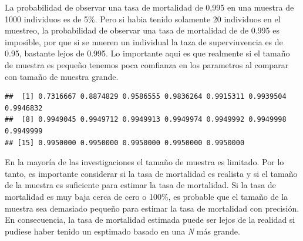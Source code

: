 \documentclass[
]{book}
\newenvironment{Shaded}{\begin{snugshade}}{\end{snugshade}}
\newcommand{\AttributeTok}[1]{\textcolor[rgb]{0.13,0.29,0.53}{#1}}
\newcommand{\CommentTok}[1]{\textcolor[rgb]{0.56,0.35,0.01}{\textit{#1}}}
\newcommand{\FloatTok}[1]{\textcolor[rgb]{0.00,0.00,0.81}{#1}}
\newcommand{\FunctionTok}[1]{\textcolor[rgb]{0.13,0.29,0.53}{\textbf{#1}}}
\newcommand{\NormalTok}[1]{#1}
\newcommand{\OtherTok}[1]{\textcolor[rgb]{0.56,0.35,0.01}{#1}}
\newcommand{\SpecialCharTok}[1]{\textcolor[rgb]{0.81,0.36,0.00}{\textbf{#1}}}
\theoremstyle{definition}
\theoremstyle{definition}
\theoremstyle{definition}
\theoremstyle{definition}
\theoremstyle{remark}
\begin{document}
La probabilidad de observar una tasa de mortalidad de 0,995 en una muestra de 1000 individuos es de 5\%. Pero si habia tenido solamente 20 individuos en el muestreo, la probabilidad de observar una tasa de mortalidad de de 0.995 es imposible, por que si se mueren un individual la taza de superviuvencia es de 0.95, bastante lejos de 0.995. Lo importante aqui es que realmente si el tamaño de muestra es pequeño tenemos poca comfianza en los parametros al comparar con tamaño de muestra grande.

\begin{Shaded}
\end{Shaded}

\begin{verbatim}
##  [1] 0.7316667 0.8874829 0.9586555 0.9836264 0.9915311 0.9939504 0.9946832
##  [8] 0.9949045 0.9949712 0.9949913 0.9949974 0.9949992 0.9949998 0.9949999
## [15] 0.9950000 0.9950000 0.9950000 0.9950000 0.9950000
\end{verbatim}

En la mayoría de las investigaciones el tamaño de muestra es limitado. Por lo tanto, es importante considerar si la tasa de mortalidad es realista y si el tamaño de la muestra es suficiente para estimar la tasa de mortalidad. Si la tasa de mortalidad es muy baja cerca de cero o 100\%, es probable que el tamaño de la muestra sea demasiado pequeño para estimar la tasa de mortalidad con precisión. En consecuencia, la tasa de mortalidad estimada puede ser lejos de la realidad si pudiese haber tenido un esptimado basado en una \emph{N} más grande.
\end{document}
